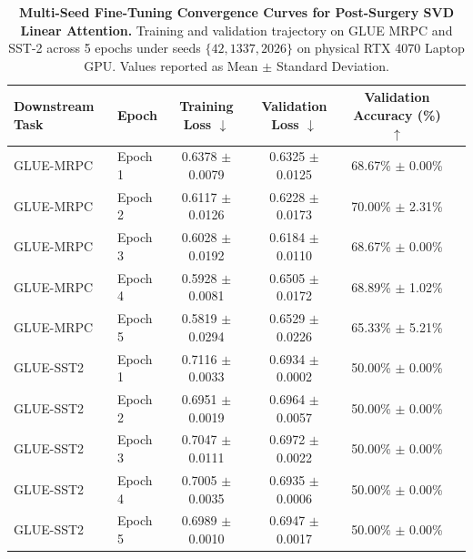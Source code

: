 
\begin{table}[t]
\centering
\small
\caption{\textbf{Multi-Seed Fine-Tuning Convergence Curves for Post-Surgery SVD Linear Attention.} Training and validation trajectory on GLUE MRPC and SST-2 across 5 epochs under seeds $\{42, 1337, 2026\}$ on physical RTX 4070 Laptop GPU. Values reported as Mean $\pm$ Standard Deviation.}
\label{tab:multiseed_finetune}
\begin{tabular}{llcccc}
\toprule
\textbf{Downstream Task} & \textbf{Epoch} & \textbf{Training Loss} $\downarrow$ & \textbf{Validation Loss} $\downarrow$ & \textbf{Validation Accuracy (\%)} $\uparrow$ \\
\midrule
GLUE-MRPC & Epoch 1 & 0.6378 $\pm$ 0.0079 & 0.6325 $\pm$ 0.0125 & 68.67\% $\pm$ 0.00\% \\
GLUE-MRPC & Epoch 2 & 0.6117 $\pm$ 0.0126 & 0.6228 $\pm$ 0.0173 & 70.00\% $\pm$ 2.31\% \\
GLUE-MRPC & Epoch 3 & 0.6028 $\pm$ 0.0192 & 0.6184 $\pm$ 0.0110 & 68.67\% $\pm$ 0.00\% \\
GLUE-MRPC & Epoch 4 & 0.5928 $\pm$ 0.0081 & 0.6505 $\pm$ 0.0172 & 68.89\% $\pm$ 1.02\% \\
GLUE-MRPC & Epoch 5 & 0.5819 $\pm$ 0.0294 & 0.6529 $\pm$ 0.0226 & 65.33\% $\pm$ 5.21\% \\
\midrule
GLUE-SST2 & Epoch 1 & 0.7116 $\pm$ 0.0033 & 0.6934 $\pm$ 0.0002 & 50.00\% $\pm$ 0.00\% \\
GLUE-SST2 & Epoch 2 & 0.6951 $\pm$ 0.0019 & 0.6964 $\pm$ 0.0057 & 50.00\% $\pm$ 0.00\% \\
GLUE-SST2 & Epoch 3 & 0.7047 $\pm$ 0.0111 & 0.6972 $\pm$ 0.0022 & 50.00\% $\pm$ 0.00\% \\
GLUE-SST2 & Epoch 4 & 0.7005 $\pm$ 0.0035 & 0.6935 $\pm$ 0.0006 & 50.00\% $\pm$ 0.00\% \\
GLUE-SST2 & Epoch 5 & 0.6989 $\pm$ 0.0010 & 0.6947 $\pm$ 0.0017 & 50.00\% $\pm$ 0.00\% \\
\bottomrule
\end{tabular}
\end{table}
